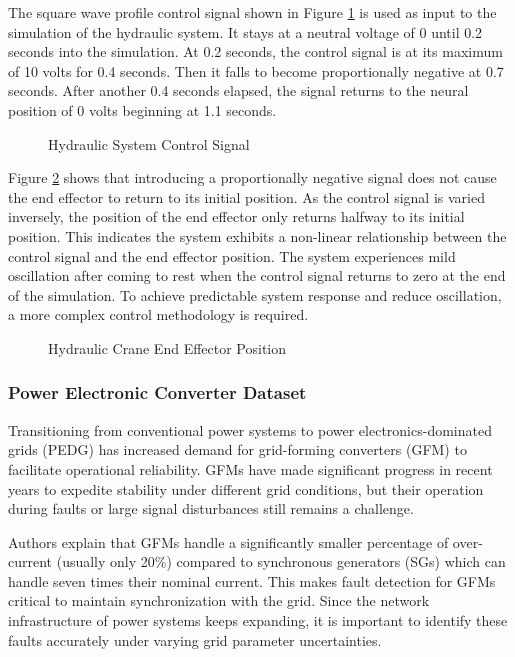 The square wave profile control signal shown in Figure \ref{fig:hydraulic_cs} is used as input to the simulation of the hydraulic system.
It stays at a neutral voltage of 0 until 0.2 seconds into the simulation.
At 0.2 seconds, the control signal is at its maximum of 10 volts for 0.4 seconds.
Then it falls to become proportionally negative at 0.7 seconds.
After another 0.4 seconds elapsed, the signal returns to the neural position of 0 volts beginning at 1.1 seconds.

\begin{figure}[H]
    
    \caption{Hydraulic System Control Signal}
    \label{fig:hydraulic_cs}
\end{figure}

Figure \ref{fig:hydraulic_pos} shows that introducing a proportionally negative signal does not cause the end effector to return to its initial position.
As the control signal is varied inversely, the position of the end effector only returns halfway to its initial position.
This indicates the system exhibits a non-linear relationship between the control signal and the end effector position.
The system experiences mild oscillation after coming to rest when the control signal returns to zero at the end of the simulation.
To achieve predictable system response and reduce oscillation, a more complex control methodology is required.

\begin{figure}[H]
    
    \caption{Hydraulic Crane End Effector Position}
    \label{fig:hydraulic_pos}
\end{figure}

\subsubsection{Power Electronic Converter Dataset}
\label{ref_pec_dataset}

Transitioning from conventional power systems to power electronics-dominated grids (PEDG) has increased demand for grid-forming converters (GFM) to facilitate operational reliability.
GFMs have made significant progress in recent years to expedite stability under different grid conditions, but their operation during faults or large signal disturbances still remains a challenge.

Authors \cite{trainsient-stability-9523750} explain that GFMs handle a significantly smaller percentage of over-current (usually only 20\%) compared to synchronous generators (SGs) which can handle seven times their nominal current.
This makes fault detection for GFMs critical to maintain synchronization with the grid.
Since the network infrastructure of power systems keeps expanding, it is important to identify these faults accurately under varying grid parameter uncertainties.

